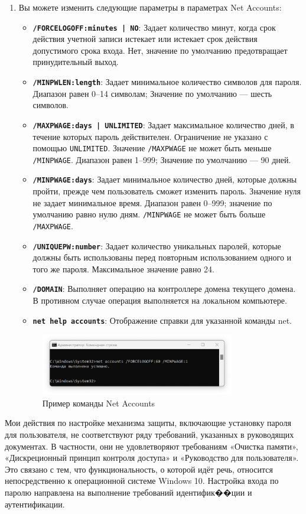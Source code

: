 \documentclass[a4paper, 14pt]{report}
\begin{document}
\begin{enumerate}
    \item Вы можете изменить следующие параметры в параметрах Net Accounts:
          \begin{itemize}
              \item \textbf{\texttt{/FORCELOGOFF:{minutes | NO}}}: Задает количество минут, когда срок действия учетной записи истекает или истекает срок действия допустимого срока входа. Нет, значение по умолчанию предотвращает принудительный выход.
              \item \textbf{\texttt{/MINPWLEN:length}}: Задает минимальное количество символов для пароля. Диапазон равен 0–14 символам; Значение по умолчанию — шесть символов.
              \item \textbf{\texttt{/MAXPWAGE:{days | UNLIMITED}}}: Задает максимальное количество дней, в течение которых пароль действителен. Ограничение не указано с помощью \texttt{UNLIMITED}. Значение \texttt{/MAXPWAGE} не может быть меньше \texttt{/MINPWAGE}. Диапазон равен 1–999; Значение по умолчанию — 90 дней.
              \item \textbf{\texttt{/MINPWAGE:days}}: Задает минимальное количество дней, которые должны пройти, прежде чем пользователь сможет изменить пароль. Значение нуля не задает минимальное время. Диапазон равен 0–999; значение по умолчанию равно нулю дням. \texttt{/MINPWAGE} не может быть больше \texttt{/MAXPWAGE}.
              \item \textbf{\texttt{/UNIQUEPW:number}}: Задает количество уникальных паролей, которые должны быть использованы перед повторным использованием одного и того же пароля. Максимальное значение равно 24.
              \item \textbf{\texttt{/DOMAIN}}: Выполняет операцию на контроллере домена текущего домена. В противном случае операция выполняется на локальном компьютере.
              \item \textbf{\texttt{net help accounts}}: Отображение справки для указанной команды net.
          \end{itemize}
          \begin{figure}[H]
              \centering
              \includegraphics[width=0.8\textwidth]{../images/net_accounts_example.png}
              \caption{Пример команды Net Accounts}
          \end{figure}
\end{enumerate}
Мои действия по настройке механизма защиты, включающие установку пароля для пользователя, не соответствуют ряду требований, указанных в руководящих документах. В частности, они не удовлетворяют требованиям «Очистка памяти», «Дискреционный принцип контроля доступа» и «Руководство для пользователя». Это связано с тем, что функциональность, о которой идёт речь, относится непосредственно к операционной системе Windows 10. Настройка входа по паролю направлена на выполнение требований идентифик��ции и аутентификации.
\end{document}

